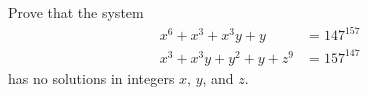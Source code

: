 Prove that the system
\begin{align*}
x^6+x^3+x^3y+y & = 147^{157} \\
x^3+x^3y+y^2+y+z^9 & = 157^{147}
\end{align*}
has no solutions in integers $x$,  $y$,  and $z$.
